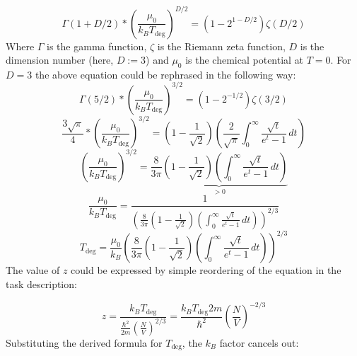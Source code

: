 \begin{equation} \label{eq:16}
\Gamma \left( 1 + D/2 \right) * \left( \frac{\mu_{0}}{k_{B} T_{\text{deg}}} \right)^{D/2}
=
\left( 1 - 2^{1 - D/2} \right) \zeta \left( D/2 \right)
\end{equation}
Where $\Gamma$ is the gamma function, $\zeta$ is the Riemann zeta function, $D$ is the dimension number (here, $D := 3$) and $\mu_{0}$ is the chemical potential at $T=0$. For $D=3$ the above equation could be rephrased in the following way:
\begin{equation} \label{eq:17}
\Gamma \left( 5/2 \right) * \left( \frac{\mu_{0}}{k_{B} T_{\text{deg}}} \right)^{3/2}
=
\left( 1 - 2^{- 1/2} \right) \zeta \left( 3/2 \right)
\end{equation}
\begin{equation} \label{eq:18}
\frac{3 \sqrt{\pi}}{4} * \left( \frac{\mu_{0}}{k_{B} T_{\text{deg}}} \right)^{3/2}
=
\left( 1 - \frac{1}{\sqrt{2}} \right) \left( \frac{2}{\sqrt{\pi}} \int_{0}^{\infty} \frac{\sqrt{t}}{e^{t} - 1}\,dt \right)
\end{equation}
\begin{equation} \label{eq:19}
\left( \frac{\mu_{0}}{k_{B} T_{\text{deg}}} \right)^{3/2}
=
\underbrace{
\frac{8}{3 \pi} \left( 1 - \frac{1}{\sqrt{2}} \right) \left( \int_{0}^{\infty} \frac{\sqrt{t}}{e^{t} - 1}\,dt \right)
}_{> 0}
\end{equation}
\begin{equation} \label{eq:20}
\frac{\mu_{0}}{k_{B} T_{\text{deg}}}
=
\frac{1}{
\left(
\frac{8}{3 \pi} \left( 1 - \frac{1}{\sqrt{2}} \right) \left( \int_{0}^{\infty} \frac{\sqrt{t}}{e^{t} - 1}\,dt \right)
\right)^{2/3}
}
\end{equation}
\begin{equation} \label{eq:21}
T_{\text{deg}}
=
\frac{\mu_{0}}{k_{B}}
\left(
\frac{8}{3 \pi} \left( 1 - \frac{1}{\sqrt{2}} \right) \left( \int_{0}^{\infty} \frac{\sqrt{t}}{e^{t} - 1}\,dt \right)
\right)^{2/3}
\end{equation}
The value of $z$ could be expressed by simple reordering of the equation in the task description:

\begin{equation} \label{eq:22}
z
=
\frac{k_{B} T_{\text{deg}}}{\frac{\hbar^{2}}{2m} \left( \frac{N}{V} \right)^{2/3}}
=
\frac{k_{B} T_{\text{deg}} 2m}{\hbar^{2}}
\left( \frac{N}{V} \right)^{-2/3}
\end{equation}
Substituting the derived formula for $T_{\text{deg}}$, the $k_{B}$ factor cancels out:

